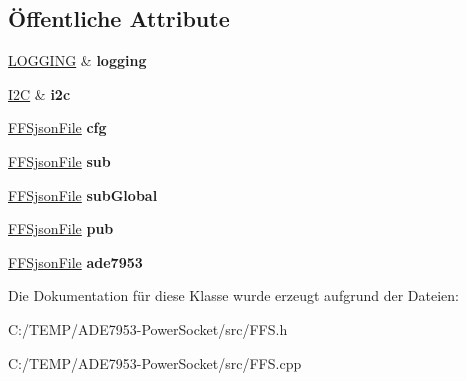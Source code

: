 \subsection*{Öffentliche Attribute}
\begin{DoxyCompactItemize}
\item 
\mbox{\label{class_f_f_s_a5bf7b746aeb7ee29a3b3081984ca4f7c}} 
\hyperlink{class_l_o_g_g_i_n_g}{L\+O\+G\+G\+I\+NG} \& {\bfseries logging}
\item 
\mbox{\label{class_f_f_s_a1d650679cb122fe7ee3b41e3deeae8f8}} 
\hyperlink{class_i2_c}{I2C} \& {\bfseries i2c}
\item 
\mbox{\label{class_f_f_s_a82ef3f922de536af2d8d5317ea130a06}} 
\hyperlink{class_f_f_sjson_file}{F\+F\+Sjson\+File} {\bfseries cfg}
\item 
\mbox{\label{class_f_f_s_afe0bcfe44bc83bc1f7ea920303309344}} 
\hyperlink{class_f_f_sjson_file}{F\+F\+Sjson\+File} {\bfseries sub}
\item 
\mbox{\label{class_f_f_s_ab718995f300e50922f3e5ea61169ae12}} 
\hyperlink{class_f_f_sjson_file}{F\+F\+Sjson\+File} {\bfseries sub\+Global}
\item 
\mbox{\label{class_f_f_s_ac5412e6cd8a38c3c2ba5505a1827dfa2}} 
\hyperlink{class_f_f_sjson_file}{F\+F\+Sjson\+File} {\bfseries pub}
\item 
\mbox{\label{class_f_f_s_afbe0842ffc05f157c3e23e907276d655}} 
\hyperlink{class_f_f_sjson_file}{F\+F\+Sjson\+File} {\bfseries ade7953}
\end{DoxyCompactItemize}


Die Dokumentation für diese Klasse wurde erzeugt aufgrund der Dateien\+:\begin{DoxyCompactItemize}
\item 
C\+:/\+T\+E\+M\+P/\+A\+D\+E7953-\/\+Power\+Socket/src/F\+F\+S.\+h\item 
C\+:/\+T\+E\+M\+P/\+A\+D\+E7953-\/\+Power\+Socket/src/F\+F\+S.\+cpp\end{DoxyCompactItemize}
